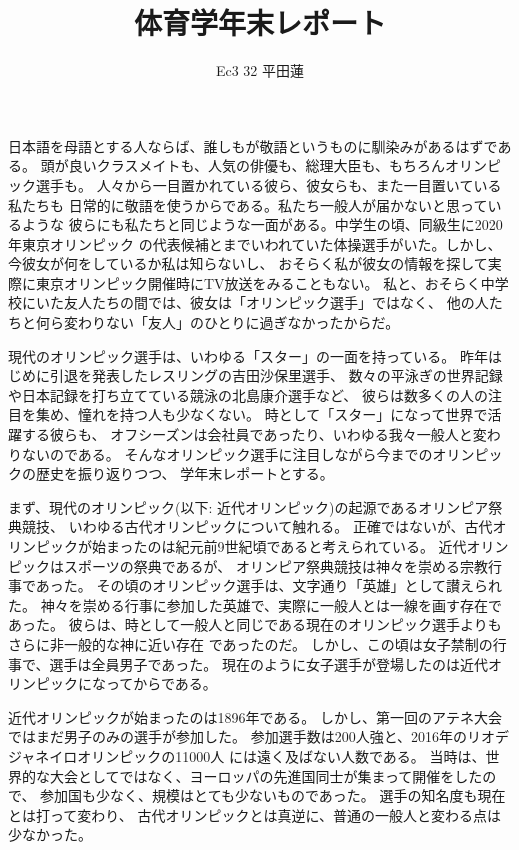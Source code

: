 \documentclass[]{jsarticle}
\title{体育学年末レポート}
\author{Ec3 32 平田蓮}
\date{}
\begin{document}
\maketitle
日本語を母語とする人ならば、誰しもが敬語というものに馴染みがあるはずである。
頭が良いクラスメイトも、人気の俳優も、総理大臣も、もちろんオリンピック選手も。
人々から一目置かれている彼ら、彼女らも、また一目置いている私たちも
日常的に敬語を使うからである。私たち一般人が届かないと思っているような
彼らにも私たちと同じような一面がある。中学生の頃、同級生に2020年東京オリンピック
の代表候補とまでいわれていた体操選手がいた。しかし、今彼女が何をしているか私は知らないし、
おそらく私が彼女の情報を探して実際に東京オリンピック開催時にTV放送をみることもない。
私と、おそらく中学校にいた友人たちの間では、彼女は「オリンピック選手」ではなく、
他の人たちと何ら変わりない「友人」のひとりに過ぎなかったからだ。

現代のオリンピック選手は、いわゆる「スター」の一面を持っている。
昨年はじめに引退を発表したレスリングの吉田沙保里選手、
数々の平泳ぎの世界記録や日本記録を打ち立てている競泳の北島康介選手など、
彼らは数多くの人の注目を集め、憧れを持つ人も少なくない。
時として「スター」になって世界で活躍する彼らも、
オフシーズンは会社員であったり、いわゆる我々一般人と変わりないのである。
そんなオリンピック選手に注目しながら今までのオリンピックの歴史を振り返りつつ、
学年末レポートとする。

まず、現代のオリンピック(以下: 近代オリンピック)の起源であるオリンピア祭典競技、
いわゆる古代オリンピックについて触れる。
正確ではないが、古代オリンピックが始まったのは紀元前9世紀頃であると考えられている。
\cite{history}
近代オリンピックはスポーツの祭典であるが、
オリンピア祭典競技は神々を崇める宗教行事であった。
その頃のオリンピック選手は、文字通り「英雄」として讃えられた。
神々を崇める行事に参加した英雄で、実際に一般人とは一線を画す存在であった。
彼らは、時として一般人と同じである現在のオリンピック選手よりもさらに非一般的な神に近い存在
であったのだ。
しかし、この頃は女子禁制の行事で、選手は全員男子であった。
現在のように女子選手が登場したのは近代オリンピックになってからである。

近代オリンピックが始まったのは1896年である。
しかし、第一回のアテネ大会ではまだ男子のみの選手が参加した。
参加選手数は200人強と、2016年のリオデジャネイロオリンピックの11000人
には遠く及ばない人数である。
当時は、世界的な大会としてではなく、ヨーロッパの先進国同士が集まって開催をしたので、
参加国も少なく、規模はとても少ないものであった。
選手の知名度も現在とは打って変わり、
古代オリンピックとは真逆に、普通の一般人と変わる点は少なかった。
\end{document}
